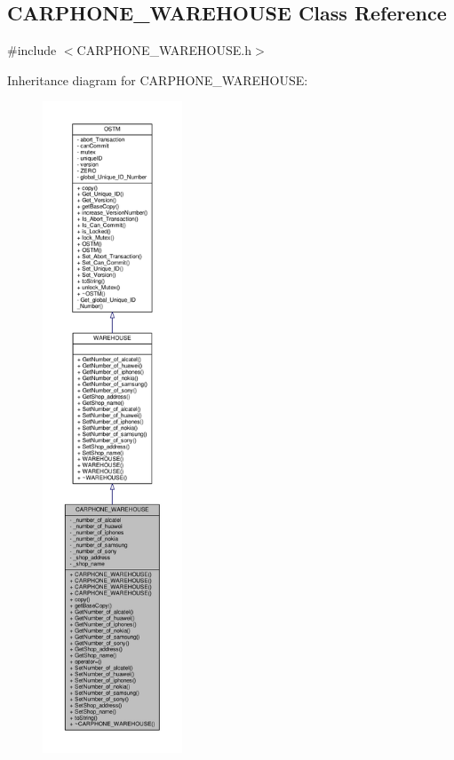\hypertarget{class_c_a_r_p_h_o_n_e___w_a_r_e_h_o_u_s_e}{}\subsection{C\+A\+R\+P\+H\+O\+N\+E\+\_\+\+W\+A\+R\+E\+H\+O\+U\+SE Class Reference}
\label{class_c_a_r_p_h_o_n_e___w_a_r_e_h_o_u_s_e}


{\ttfamily \#include $<$C\+A\+R\+P\+H\+O\+N\+E\+\_\+\+W\+A\+R\+E\+H\+O\+U\+S\+E.\+h$>$}



Inheritance diagram for C\+A\+R\+P\+H\+O\+N\+E\+\_\+\+W\+A\+R\+E\+H\+O\+U\+SE\+:\nopagebreak
\begin{figure}[H]
\begin{center}
\leavevmode
\includegraphics[height=550pt]{class_c_a_r_p_h_o_n_e___w_a_r_e_h_o_u_s_e__inherit__graph}
\end{center}
\end{figure}


